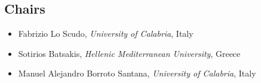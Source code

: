 \documentclass[
]{ceurart}
\begin{document}

\subsection*{Chairs}
\begin{itemize}
\item Fabrizio Lo Scudo, \emph{University of Calabria}, Italy

\item Sotirios Batsakis, \emph{Hellenic Mediterranean University}, Greece

\item Manuel Alejandro Borroto Santana, \emph{University of Calabria}, Italy
\end{itemize}
\end{document}
